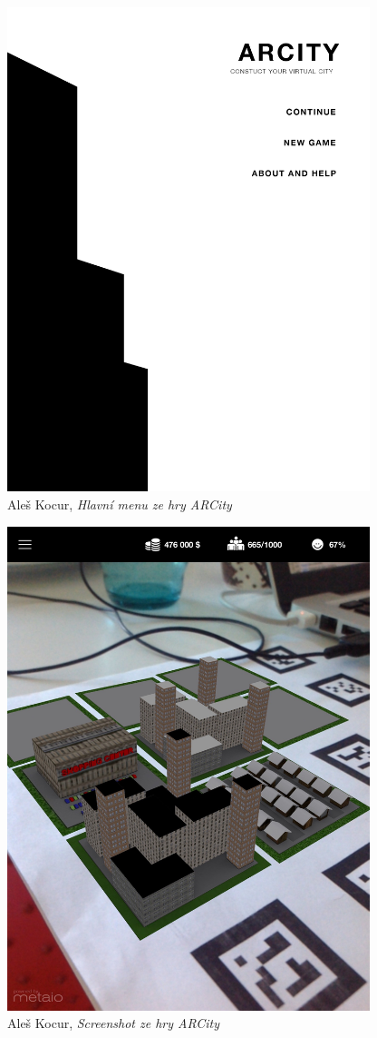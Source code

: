 \documentclass[twoside,12pt]{article}
\begin{document}
\begin{figure}[H]
\centering
    \includegraphics[width=400px, center]{images/screenshot2.png}
\captionsetup{justification=centering}
    \caption{Aleš Kocur, \textit{Hlavní menu ze hry ARCity}}
    \label{screenshot3}
\end{figure}

\begin{figure}[H]
\centering
    \includegraphics[width=400px, center]{images/screenshot3.jpg}
\captionsetup{justification=centering}
    \caption{Aleš Kocur, \textit{Screenshot ze hry ARCity}}
    \label{screenshot3}
\end{figure}
\end{document}
